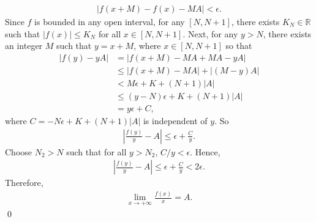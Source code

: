 \documentclass[11pt]{amsart}
\theoremstyle{plain}
\numberwithin{equation}{section}
\begin{document}
\begin{align*}
    \left|f\left(x+M\right)-f(x)-MA\right|<\epsilon.
\end{align*}
Since $f$ is bounded in any open interval, for any $[N,N+1]$, there exists $K_{N}\in\mathbb{R}$ such that $\left|f(x)\right|\leq K_{N}$ for all $x\in[N,N+1]$. Next, for any $y>N$, there exists an integer $M$ such that $y=x+M$, where $x\in[N,N+1]$ so that
\begin{align*}
\left|f(y)-yA\right|&=\left|f\left(x+M\right)-MA+MA-yA\right|
\\
&\leq\left|f(x+M) - MA\right| + \left|(M-y)A\right|
\\
&<M\epsilon+K+(N+1)|A| 
\\
&\leq(y-N)\epsilon+K+(N+1)|A|
\\
&=y\epsilon+C,
\end{align*}
where $C=-N\epsilon+K+(N+1)|A|$ is independent of $y$. So
\begin{align*}
    \left|\frac{f(y)}{y}-A\right|\leq\epsilon+\frac{C}{y}.
\end{align*}
Choose $N_{2}>N$ such that for all $y>N_{2}$, $C/y<\epsilon$. Hence, 
\begin{align*}
    \left|\frac{f(y)}{y}-A\right|\leq\epsilon+\frac{C}{y}<2\epsilon.
\end{align*}
Therefore,
\begin{align*}
    \lim_{x\to+\infty}\frac{f(x)}{x}=A.
\end{align*} \qed 
\end{document}
